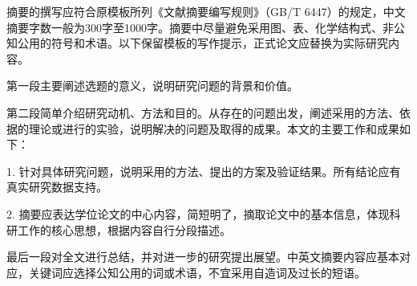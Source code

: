 \begin{cnabstract}
摘要的撰写应符合原模板所列《文献摘要编写规则》（GB/T 6447）的规定，中文摘要字数一般为300字至1000字。摘要中尽量避免采用图、表、化学结构式、非公知公用的符号和术语。以下保留模板的写作提示，正式论文应替换为实际研究内容。

第一段主要阐述选题的意义，说明研究问题的背景和价值。

第二段简单介绍研究动机、方法和目的。从存在的问题出发，阐述采用的方法、依据的理论或进行的实验，说明解决的问题及取得的成果。本文的主要工作和成果如下：

1. 针对具体研究问题，说明采用的方法、提出的方案及验证结果。所有结论应有真实研究数据支持。

2. 摘要应表达学位论文的中心内容，简短明了，摘取论文中的基本信息，体现科研工作的核心思想，根据内容自行分段描述。

最后一段对全文进行总结，并对进一步的研究提出展望。中英文摘要内容应基本对应，关键词应选择公知公用的词或术语，不宜采用自造词及过长的短语。
\end{cnabstract}
